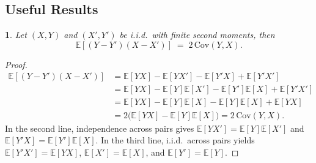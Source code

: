 \documentclass[11pt]{article}
\theoremstyle{plain}
\theoremstyle{plain}
\theoremstyle{plain}
\theoremstyle{plain}
\theoremstyle{plain}
\theoremstyle{plain}
\theoremstyle{plain}
\newtheorem{lemma}{\protect\lemmaname}
\providecommand{\lemmaname}{Lemma}
\begin{document}

\subsection{Useful Results}
\label{oro_weighted}
\begin{lemma}
Let $(X,Y)$ and $(X',Y')$ be i.i.d.\ with finite second moments, then
\[
\mathbb{E}\!\left[(Y-Y')(X-X')\right] \;=\; 2\,\mathrm{Cov}(Y,X).
\]
\end{lemma}

\begin{proof}
\begin{align*}
\mathbb{E}\!\left[(Y-Y')(X-X')\right]
&= \mathbb{E}[YX]-\mathbb{E}[YX']-\mathbb{E}[Y'X]+\mathbb{E}[Y'X'] \\
&= \mathbb{E}[YX]-\mathbb{E}[Y]\mathbb{E}[X']-\mathbb{E}[Y']\mathbb{E}[X]+\mathbb{E}[Y'X'] \\
&= \mathbb{E}[YX]-\mathbb{E}[Y]\mathbb{E}[X]-\mathbb{E}[Y]\mathbb{E}[X]+\mathbb{E}[YX] \\
&= 2\big(\mathbb{E}[YX]-\mathbb{E}[Y]\mathbb{E}[X]\big)
= 2\,\mathrm{Cov}(Y,X).
\end{align*}
In the second line, independence across pairs gives
$\mathbb{E}[YX']=\mathbb{E}[Y]\mathbb{E}[X']$ and
$\mathbb{E}[Y'X]=\mathbb{E}[Y']\mathbb{E}[X]$.
In the third line, i.i.d.\ across pairs yields
$\mathbb{E}[Y'X']=\mathbb{E}[YX]$, $\mathbb{E}[X']=\mathbb{E}[X]$, and $\mathbb{E}[Y']=\mathbb{E}[Y]$.
\end{proof}
\end{document}
